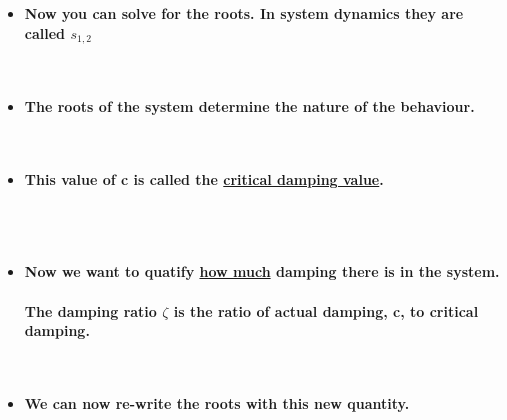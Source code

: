 \documentclass[11pt]{article}
\begin{document}
\begin{itemize}
\item \textbf{\large Now you can solve for the roots. In system dynamics they are called $s_{1,2}$}\\\\

	 \\

\item \textbf{\large The roots of the system determine the nature of the behaviour.}\\\\

 \\

\item \textbf{\large This value of c is called the \underline{critical damping value}.}\\\\


\vspace{5mm} \\
 \vspace{5mm}\\


\newpage
\item \textbf{\large Now we want to quatify \underline{how much} damping there is in the system.}\\\\

\textbf{\large The damping ratio $\zeta$ is the ratio of actual damping, c, to critical damping. }\\\\

 \\


\item \textbf{\large We can now re-write the roots with this new quantity.}\\\\


\end{itemize}
\end{document}
